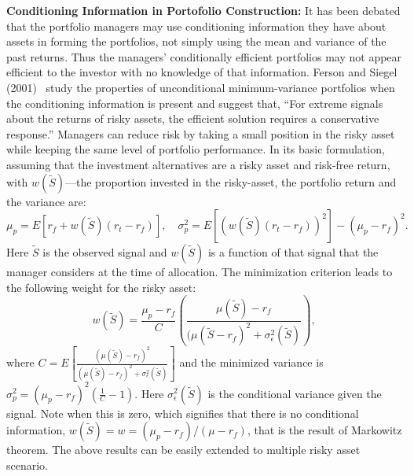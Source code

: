 \noindent\textbf{Conditioning Information in Portofolio Construction:} It has been debated that the portfolio managers may use conditioning information they have about assets in forming the portfolios, not simply using the mean and variance of the past returns. Thus the managers' conditionally efficient portfolios may not appear efficient to the investor with no knowledge of that information. Ferson and Siegel (2001)~\cite{fersie} study the properties of unconditional minimum-variance portfolios when the conditioning information is present and suggest that, ``For extreme signals about the returns of risky assets, the efficient solution requires a conservative response.'' Managers can reduce risk by taking a small position in the risky asset while keeping the same level of portfolio performance. In its basic formulation, assuming that the investment alternatives are a risky asset and risk-free return, with $w(\tilde{S})$---the proportion invested in the risky-asset, the portfolio return and the variance are: 
	\begin{equation} \label{eqn:preturnvar}
	\mu_p= E[r_f+w(\tilde{S})(r_t-r_f)], \quad \sigma_p^2= E[(w(\tilde{S})(r_t - r_f))^2] - (\mu_p - r_f)^2.
	\end{equation}
Here $\tilde{S}$ is the observed signal and $w(\tilde{S})$ is a function of that signal that the manager considers at the time of allocation. The minimization criterion leads to the following weight for the risky asset:
	\begin{equation} \label{eqn:riskyassetweight}
	w(\tilde{S})= \dfrac{\mu_p - r_f}{C} \left( \dfrac{\mu(\tilde{S}) - r_f}{(\mu(\tilde{S} - r_f)^2 + \sigma^2_\epsilon(\tilde{S})} \right),
	\end{equation}
where $C= E\left[ \frac{(\mu(\tilde{S}) - r_f)^2}{(\mu(\tilde{S}) - r_f)^2 + \sigma^2_\epsilon(\tilde{S})} \right]$ and the minimized variance is ${\sigma_p^2=(\mu_p - r_f)^2 \left( \frac{1}{C} - 1 \right)}$. Here $\sigma_\epsilon^2(\tilde{S})$ is the conditional variance given the signal. Note when this is zero, which signifies that there is no conditional information, $w(\tilde{S})= w= (\mu_p - r_f)/(\mu - r_f)$, that is the result of Markowitz theorem. The above results can be easily extended to multiple risky asset scenario.


